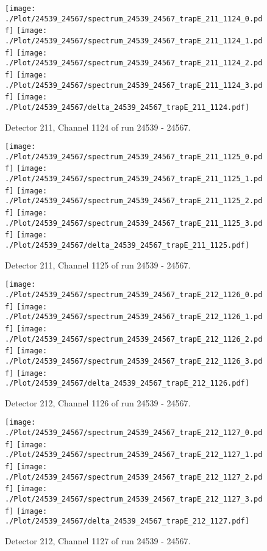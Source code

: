 \clearpage
\begin{figure}[hb]
\centering
\texttt{[image: ./Plot/24539\_24567/spectrum\_24539\_24567\_trapE\_211\_1124\_0.pdf]}
\texttt{[image: ./Plot/24539\_24567/spectrum\_24539\_24567\_trapE\_211\_1124\_1.pdf]}
\texttt{[image: ./Plot/24539\_24567/spectrum\_24539\_24567\_trapE\_211\_1124\_2.pdf]}
\texttt{[image: ./Plot/24539\_24567/spectrum\_24539\_24567\_trapE\_211\_1124\_3.pdf]}
\texttt{[image: ./Plot/24539\_24567/delta\_24539\_24567\_trapE\_211\_1124.pdf]}
\caption{ Detector 211, Channel 1124 of run 24539 - 24567.}
\label{fig:24539_24567_trapE_211_1124}
\end{figure}
\clearpage
\begin{figure}[hb]
\centering
\texttt{[image: ./Plot/24539\_24567/spectrum\_24539\_24567\_trapE\_211\_1125\_0.pdf]}
\texttt{[image: ./Plot/24539\_24567/spectrum\_24539\_24567\_trapE\_211\_1125\_1.pdf]}
\texttt{[image: ./Plot/24539\_24567/spectrum\_24539\_24567\_trapE\_211\_1125\_2.pdf]}
\texttt{[image: ./Plot/24539\_24567/spectrum\_24539\_24567\_trapE\_211\_1125\_3.pdf]}
\texttt{[image: ./Plot/24539\_24567/delta\_24539\_24567\_trapE\_211\_1125.pdf]}
\caption{ Detector 211, Channel 1125 of run 24539 - 24567.}
\label{fig:24539_24567_trapE_211_1125}
\end{figure}
\clearpage
\begin{figure}[hb]
\centering
\texttt{[image: ./Plot/24539\_24567/spectrum\_24539\_24567\_trapE\_212\_1126\_0.pdf]}
\texttt{[image: ./Plot/24539\_24567/spectrum\_24539\_24567\_trapE\_212\_1126\_1.pdf]}
\texttt{[image: ./Plot/24539\_24567/spectrum\_24539\_24567\_trapE\_212\_1126\_2.pdf]}
\texttt{[image: ./Plot/24539\_24567/spectrum\_24539\_24567\_trapE\_212\_1126\_3.pdf]}
\texttt{[image: ./Plot/24539\_24567/delta\_24539\_24567\_trapE\_212\_1126.pdf]}
\caption{ Detector 212, Channel 1126 of run 24539 - 24567.}
\label{fig:24539_24567_trapE_212_1126}
\end{figure}
\clearpage
\begin{figure}[hb]
\centering
\texttt{[image: ./Plot/24539\_24567/spectrum\_24539\_24567\_trapE\_212\_1127\_0.pdf]}
\texttt{[image: ./Plot/24539\_24567/spectrum\_24539\_24567\_trapE\_212\_1127\_1.pdf]}
\texttt{[image: ./Plot/24539\_24567/spectrum\_24539\_24567\_trapE\_212\_1127\_2.pdf]}
\texttt{[image: ./Plot/24539\_24567/spectrum\_24539\_24567\_trapE\_212\_1127\_3.pdf]}
\texttt{[image: ./Plot/24539\_24567/delta\_24539\_24567\_trapE\_212\_1127.pdf]}
\caption{ Detector 212, Channel 1127 of run 24539 - 24567.}
\label{fig:24539_24567_trapE_212_1127}
\end{figure}
